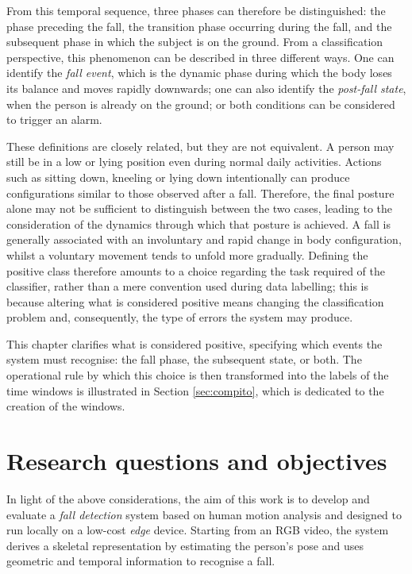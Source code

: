 From this temporal sequence, three phases can therefore be distinguished: the phase preceding the fall, the transition phase occurring during the fall, and the subsequent phase in which the subject is on the ground.
From a classification perspective, this phenomenon can be described in three different ways. One can identify the \emph{fall event}, which is the dynamic phase during which the body loses its balance and moves rapidly downwards; one can also identify the \emph{post-fall state}, when the person is already on the ground; or both conditions can be considered to trigger an alarm.

These definitions are closely related, but they are not equivalent. A person may still be in a low or lying position even during normal daily activities. Actions such as sitting down, kneeling or lying down intentionally can produce configurations similar to those observed after a fall. Therefore, the final posture alone may not be sufficient to distinguish between the two cases, leading to the consideration of the dynamics through which that posture is achieved. A fall is generally associated with an involuntary and rapid change in body configuration, whilst a voluntary movement tends to unfold more gradually.
Defining the positive class therefore amounts to a choice regarding the task required of the classifier, rather than a mere convention used during data labelling; this is because altering what is considered positive means changing the classification problem and, consequently, the type of errors the system may produce.

This chapter clarifies what is considered positive, specifying which events the system must recognise: the fall phase, the subsequent state, or both. The operational rule by which this choice is then transformed into the labels of the time windows is illustrated in Section \ref{sec:compito}, which is dedicated to the creation of the windows.

\section{Research questions and objectives}

In light of the above considerations, the aim of this work is to develop and evaluate a \emph{fall detection} system based on human motion analysis and designed to run locally on a low-cost \emph{edge} device. Starting from an RGB video, the system derives a skeletal representation by estimating the person's pose and uses geometric and temporal information to recognise a fall.

